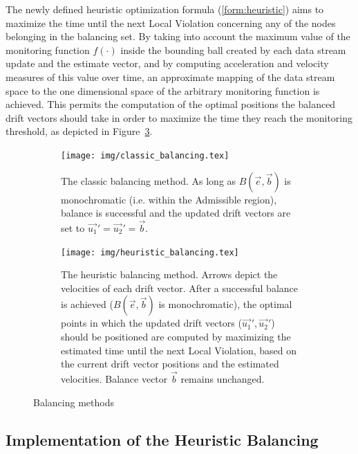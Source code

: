 The newly defined heuristic optimization formula (\ref{form:heuristic}) aims to maximize the time until the next Local Violation concerning any of the nodes belonging in the balancing set. By taking into account the maximum value of the monitoring function $f(\cdot)$ inside the bounding ball created by each data stream update and the estimate vector, and by computing acceleration and velocity measures of this value over time, an approximate mapping of the data stream space to the one dimensional space of the arbitrary monitoring function is achieved. This permits the computation of the optimal positions the balanced drift vectors should take in order to maximize the time they reach the monitoring threshold, as depicted in Figure~\ref{fig:heuristicbalancing}.

\begin{figure}[t!]
\centering
\begin{subfigure}[t]{0.45\textwidth}
\centering
\texttt{[image: img/classic\_balancing.tex]}
\caption{The classic balancing method. As long as $B(\vec{e}, \vec{b})$ is monochromatic (i.e. within the Admissible region), balance is successful and the updated drift vectors are set to $\vec{u_1}'=\vec{u_2}'=\vec{b}$.} 
\label{fig:classicbalancing}
\end{subfigure}
\begin{subfigure}[t]{0.45\textwidth}
\centering
\texttt{[image: img/heuristic\_balancing.tex]}
\caption{The heuristic balancing method. Arrows depict the velocities of each drift vector. After a successful balance is achieved ($B(\vec{e}, \vec{b})$ is monochromatic), the optimal points in which the updated drift vectors ($\vec{u_1}', \vec{u_2}'$) should be positioned are computed by maximizing the estimated time until the next Local Violation, based on the current drift vector positions and the estimated velocities. Balance vector $\vec{b}$ remains unchanged.\\} 
\label{fig:heuristicbalancing}
\end{subfigure}
\caption{Balancing methods}
\end{figure}

\subsection{Implementation of the Heuristic Balancing}


